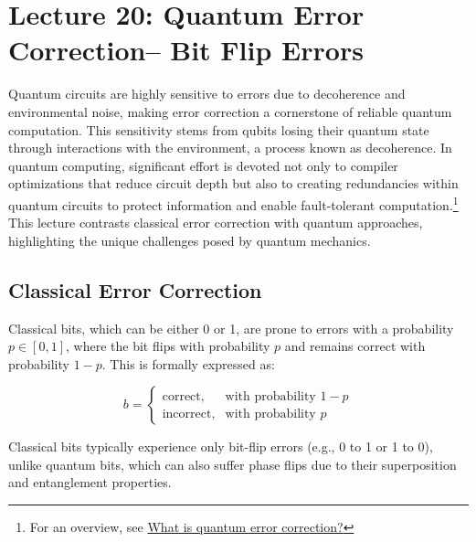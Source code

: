 \section{Lecture 20: Quantum Error Correction-- Bit Flip Errors}
\label{sec:lecture20}

Quantum circuits are highly sensitive to errors due to decoherence and
environmental noise, making error correction a cornerstone of reliable
quantum computation. This sensitivity stems from qubits losing their quantum
state through interactions with the environment, a process known as
decoherence. In quantum computing, significant effort is devoted not only to
compiler optimizations that reduce circuit depth but also to creating
redundancies within quantum circuits to protect information and enable
fault-tolerant computation.\footnote{For an overview, see
  \href{https://q-ctrl.com/topics/what-is-quantum-error-correction}{What is
quantum error correction?}} This lecture contrasts classical error correction
with quantum approaches, highlighting the unique challenges posed by quantum
mechanics.

\subsection*{Classical Error Correction}

Classical bits, which can be either 0 or 1, are prone to errors with a
probability \( p \in [0, 1] \), where the bit flips with probability \( p \)
and remains correct with probability \( 1 - p \). This is formally expressed as:

\[
  b =
  \begin{cases}
    \text{correct}, & \text{with probability } 1 - p \\
    \text{incorrect}, & \text{with probability } p
  \end{cases}
\]

Classical bits typically experience only bit-flip errors (e.g., 0 to 1 or 1
to 0), unlike quantum bits, which can also suffer phase flips due to their
superposition and entanglement properties.

